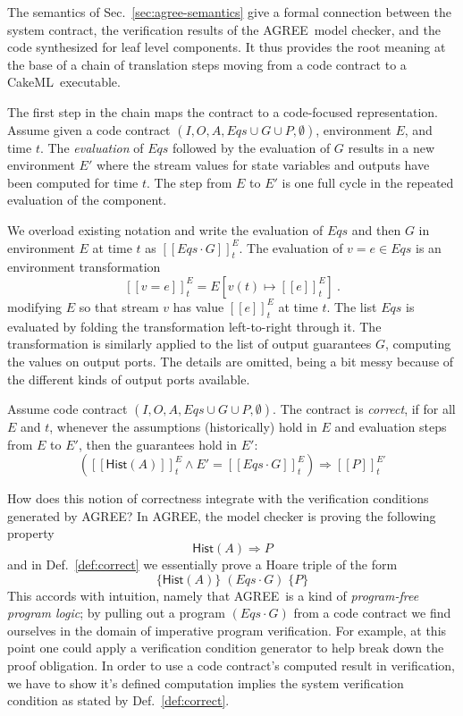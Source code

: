 \documentclass[global,twocolumn]{svjour}
\newcommand{\konst}[1]{\ensuremath{\mathsf{#1}}}
\newcommand{\imp}{\Rightarrow}
\newcommand{\set}[1]{\ensuremath{\{ {#1} \}}}
\newcommand{\sem}[1]{\ensuremath{[\![ #1 ]\!]}}
\newcommand{\Eqs}{\ensuremath{\mathit{Eqs}}}
\newcommand{\secref}[1]{Sec.~\ref{#1}}
\newcommand{\defref}[1]{Def.~\ref{#1}}
\newcommand{\agr}{AGREE}
\newcommand{\ckml}{CakeML}
\begin{document}
The semantics of \secref{sec:agree-semantics} give a formal connection between the system contract, the verification results of the \agr\ model checker, and the code synthesized for leaf level components.
%
It thus provides the root meaning at the base of a chain of translation steps moving from a code contract to a \ckml\ executable.

The first step in the chain maps the contract to a code-focused representation.
Assume given a code contract $(I,O,A,\mathit{Eqs} \cup G \cup P,\emptyset)$, environment $E$, and time $t$.
%
The \emph{evaluation} of $\mathit{Eqs}$ followed by the evaluation of $G$ results in a new environment $E'$ where the stream values for state variables and outputs have been computed for time $t$.
%
The step from $E$ to $E'$ is one full cycle in the repeated evaluation of the component.

\begin{definition}[Evaluation]
We overload existing notation and write the evaluation of $\mathit{Eqs}$ and then $G$ in environment $E$ at time $t$ as $\sem{\mathit{Eqs}\cdot G}^E_t$.
%
The evaluation of $v = e \in {\Eqs}$ is an environment transformation
%
\[
 \sem{v = e}^E_t = E[v(t) \mapsto\sem{e}^E_t] \ .
\]
%
modifying $E$ so that stream $v$ has value $\sem{e}^E_t$ at time $t$.
%
The list {\Eqs} is evaluated by folding the transformation left-to-right through it.
%
The transformation is similarly applied to the list of output guarantees $G$, computing the values on output ports.
%
The details are omitted, being a bit messy because of the different kinds of output ports available.
\end{definition}

\begin{definition}
Assume code contract $(I,O,A,\mathit{Eqs} \cup G \cup P,\emptyset)$.
%
The contract is \emph{correct}, if for all $E$ and $t$, whenever the assumptions (historically) hold in $E$ and evaluation steps from $E$ to $E'$, then the guarantees hold in $E'$:
%
\[
(\sem{\konst{Hist}(A)}^E_t \land E' = \sem{\mathit{Eqs} \cdot G}^E_t) \imp \sem{P}^{E'}_t
\]
%
\end{definition}\label{def:correct}

How does this notion of correctness integrate with the verification conditions generated by \agr?
%
In \agr, the model checker is proving the following property
%
\[
\konst{Hist}(A) \imp P
\]
%
and in \defref{def:correct} we essentially prove a Hoare triple of the form
%
\[
\set{\konst{Hist}(A)}\; (\mathit{Eqs} \cdot G) \; \set{P}
\]
%
This accords with intuition, namely that \agr\ is a kind of \emph{program-free program logic};
%
by pulling out a program $(\mathit{Eqs}\cdot G)$ from a code contract we find ourselves in the domain of imperative program verification.
%
For example, at this point one could apply a verification condition generator to help break down the proof obligation.
%
In order to use a code contract's computed result in verification, we have to show it's defined computation implies the system verification condition as stated by \defref{def:correct}.
\end{document}
